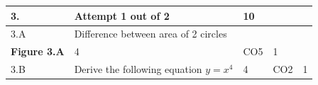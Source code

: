 \documentclass[12pt]{article}
\begin{document}
\begin{longtable}{|L{1cm}|L{8cm}|C{1cm}|C{1cm}|C{1cm}|}\hline
	\bf3. & \bf{Attempt} \bf{1} \bf{out of} \bf{2} & \bf{10}  & & \\ \hline





		3.A &
	Difference between area of 2 circles \newline
			\begin{center}
		\includegraphics[width=4cm,height=3cm]{media/diagrams/diagram.png}\\\bf{Figure }\bf3.A		
	\end{center}
		
	 &  4 & CO5 & 1\\ \hline
		3.B &
	Derive the following equation $y=x^{4}$ \newline
			
	 &  4 & CO2 & 1\\ \hline
	\end{longtable}
\end{document}
